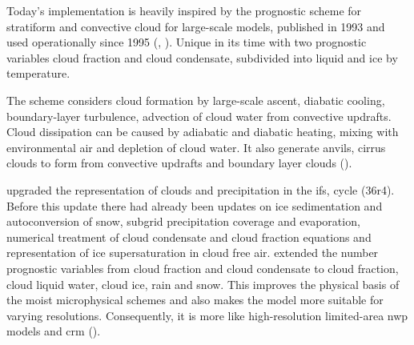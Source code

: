 Today's implementation is heavily inspired by the prognostic scheme for stratiform and convective cloud for large-scale models, published in 1993 and used operationally since 1995 (\cite{Tiedtke1993}, \cite{Tomkins2005}). Unique in its time with two prognostic variables cloud fraction and cloud condensate, subdivided into liquid and ice by temperature. 

The scheme considers cloud formation by large-scale ascent, diabatic cooling, boundary-layer turbulence, advection of cloud water from convective updrafts. Cloud dissipation can be caused by adiabatic and diabatic heating, mixing with environmental air and depletion of cloud water. It also generate anvils, cirrus clouds to form from convective updrafts and boundary layer clouds (\cite{Tiedtke1993}).

 upgraded the representation of clouds and precipitation in the \acrshort{ifs}, cycle (36r4). Before this update there had already been updates on ice sedimentation and autoconversion of snow, subgrid precipitation coverage and evaporation, numerical treatment of cloud condensate and cloud fraction equations and representation of ice supersaturation in cloud free air. \citeauthor{Forbes2011AnPrecipitation} extended the number prognostic variables from cloud fraction and cloud condensate to cloud fraction, cloud liquid water, cloud ice, rain and snow. This improves the physical basis of the moist microphysical schemes and also makes the model more suitable for varying resolutions. Consequently, it is more like high-resolution limited-area \acrshort{nwp} models and \acrshort{crm} (\cite{Forbes2011AnPrecipitation}).

